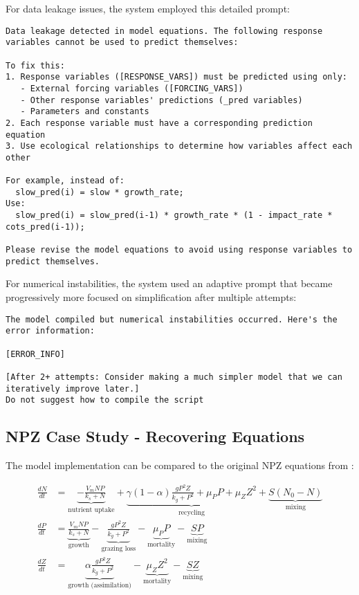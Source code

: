 For data leakage issues, the system employed this detailed prompt:

\begin{lstlisting}
Data leakage detected in model equations. The following response variables cannot be used to predict themselves:

To fix this:
1. Response variables ([RESPONSE_VARS]) must be predicted using only:
   - External forcing variables ([FORCING_VARS])
   - Other response variables' predictions (_pred variables)
   - Parameters and constants
2. Each response variable must have a corresponding prediction equation
3. Use ecological relationships to determine how variables affect each other

For example, instead of:
  slow_pred(i) = slow * growth_rate;
Use:
  slow_pred(i) = slow_pred(i-1) * growth_rate * (1 - impact_rate * cots_pred(i-1));

Please revise the model equations to avoid using response variables to predict themselves.
\end{lstlisting}

For numerical instabilities, the system used an adaptive prompt that became progressively more focused on simplification after multiple attempts:

\begin{lstlisting}
The model compiled but numerical instabilities occurred. Here's the error information:

[ERROR_INFO]

[After 2+ attempts: Consider making a much simpler model that we can iteratively improve later.]
Do not suggest how to compile the script
\end{lstlisting}

\subsection{NPZ Case Study - Recovering Equations}
\label{subsec:npz_evaluation_prompt}

The model implementation can be compared to the original NPZ equations from \cite{edwards1999zooplankton}:

\begin{align*}
    \frac{dN}{dt} &= \underbrace{-\frac{V_m N P}{k_s + N}}_{\text{nutrient uptake}}
                   + \underbrace{\gamma(1-\alpha)\frac{g P^2 Z}{k_g + P^2} + \mu_P P + \mu_Z Z^2}_{\text{recycling}}
                   + \underbrace{S(N_0 - N)}_{\text{mixing}} \\[6pt]
    \frac{dP}{dt} &= \underbrace{\frac{V_m N P}{k_s + N}}_{\text{growth}}
                   - \underbrace{\frac{g P^2 Z}{k_g + P^2}}_{\text{grazing loss}}
                   - \underbrace{\mu_P P}_{\text{mortality}}
                   - \underbrace{S P}_{\text{mixing}} \\[6pt]
    \frac{dZ}{dt} &= \underbrace{\alpha\frac{g P^2 Z}{k_g + P^2}}_{\text{growth (assimilation)}}
                   - \underbrace{\mu_Z Z^2}_{\text{mortality}}
                   - \underbrace{S Z}_{\text{mixing}}
    \end{align*}

